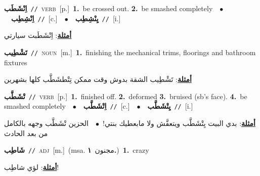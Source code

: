 \documentclass[10pt,a4paper,twoside]{article} %
\begin{document}
\begin{multicols}{2}
{\setlength\topsep{0pt}\textbf{\foreignlanguage{arabic}{اِنْشَطَب}}\ {\color{gray}\texttt{//}\color{black}}\ \textsc{verb}\ [p.]\ \textbf{1.}~be crossed out.  \textbf{2.}~be smashed completely\ \ $\bullet$\ \ \setlength\topsep{0pt}\textbf{\foreignlanguage{arabic}{اِنْشِطِب}}\ {\color{gray}\texttt{//}\color{black}}\ [c.]\ \ $\bullet$\ \ \setlength\topsep{0pt}\textbf{\foreignlanguage{arabic}{يِنْشِطِب}}\ {\color{gray}\texttt{//}\color{black}}\ [i.]\  \begin{flushright}\color{gray}\foreignlanguage{arabic}{\textbf{\underline{\foreignlanguage{arabic}{أمثلة}}}: اِنْشَطَبت سيارتي}\end{flushright}\color{black}} \vspace{2mm}

{\setlength\topsep{0pt}\textbf{\foreignlanguage{arabic}{تَشْطِيب}}\ {\color{gray}\texttt{//}\color{black}}\ \textsc{noun}\ [m.]\ \textbf{1.}~finishing the mechanical trims, floorings and bathroom fixtures\  \begin{flushright}\color{gray}\foreignlanguage{arabic}{\textbf{\underline{\foreignlanguage{arabic}{أمثلة}}}: تَشْطِيب الشقة بدوش وقت ممكن تِتْطشَطَّب كلها بشهرين}\end{flushright}\color{black}} \vspace{2mm}

{\setlength\topsep{0pt}\textbf{\foreignlanguage{arabic}{تْشَطَّب}}\ {\color{gray}\texttt{//}\color{black}}\ \textsc{verb}\ [p.]\ \textbf{1.}~finished off.  \textbf{2.}~deformed  \textbf{3.}~bruised (sb's face).  \textbf{4.}~be smashed completely\ \ $\bullet$\ \ \setlength\topsep{0pt}\textbf{\foreignlanguage{arabic}{اِتْشَطَّب}}\ {\color{gray}\texttt{//}\color{black}}\ [c.]\ \ $\bullet$\ \ \setlength\topsep{0pt}\textbf{\foreignlanguage{arabic}{يِتْشَطَّب}}\ {\color{gray}\texttt{//}\color{black}}\ [i.]\  \begin{flushright}\color{gray}\foreignlanguage{arabic}{\textbf{\underline{\foreignlanguage{arabic}{أمثلة}}}: بدي البيت يِتْشَطَّب ويتعفَّش ولا مابعطيك بنتي!\ $\bullet$\ \  الحزين تْشَطَّب وجهه بالكامل من بعد الحادث}\end{flushright}\color{black}} \vspace{2mm}

{\setlength\topsep{0pt}\textbf{\foreignlanguage{arabic}{شَاطِب}}\ {\color{gray}\texttt{//}\color{black}}\ \textsc{adj}\ [m.]\ \color{gray}(msa. \foreignlanguage{arabic}{مجنون}~\foreignlanguage{arabic}{\textbf{١.}})\color{black}\ \textbf{1.}~crazy\  \begin{flushright}\color{gray}\foreignlanguage{arabic}{\textbf{\underline{\foreignlanguage{arabic}{أمثلة}}}: لؤي شاطِب!}\end{flushright}\color{black}} \vspace{2mm}


\end{multicols}
\end{document}
